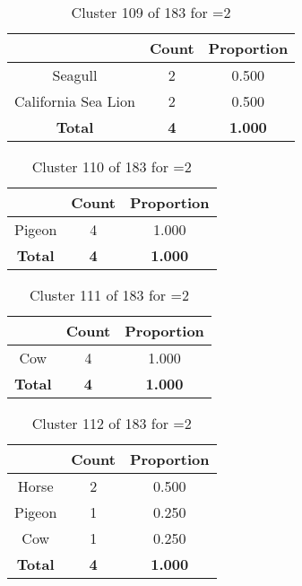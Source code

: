 \begin{table}[ht!]
\centering
\begin{tabular}{|c|c|c|}
\hline
\bf \Spec{} &\bf Count &\bf Proportion\\ \hline \hline
Seagull & 2 & 0.500\\ \hline
California Sea Lion & 2 & 0.500\\ \hline
\hline
\bf Total & \bf 4 & \bf 1.000\\ \hline
\end{tabular}
\label{tab:cluster:109:2}
\caption{Cluster 109 of 183 for \minneigh{}=2}
\end{table}

\clearpage
\begin{table}[ht!]
\centering
\begin{tabular}{|c|c|c|}
\hline
\bf \Spec{} &\bf Count &\bf Proportion\\ \hline \hline
Pigeon & 4 & 1.000\\ \hline
\hline
\bf Total & \bf 4 & \bf 1.000\\ \hline
\end{tabular}
\label{tab:cluster:110:2}
\caption{Cluster 110 of 183 for \minneigh{}=2}
\end{table}

\begin{table}[ht!]
\centering
\begin{tabular}{|c|c|c|}
\hline
\bf \Spec{} &\bf Count &\bf Proportion\\ \hline \hline
Cow & 4 & 1.000\\ \hline
\hline
\bf Total & \bf 4 & \bf 1.000\\ \hline
\end{tabular}
\label{tab:cluster:111:2}
\caption{Cluster 111 of 183 for \minneigh{}=2}
\end{table}

\begin{table}[ht!]
\centering
\begin{tabular}{|c|c|c|}
\hline
\bf \Spec{} &\bf Count &\bf Proportion\\ \hline \hline
Horse & 2 & 0.500\\ \hline
Pigeon & 1 & 0.250\\ \hline
Cow & 1 & 0.250\\ \hline
\hline
\bf Total & \bf 4 & \bf 1.000\\ \hline
\end{tabular}
\label{tab:cluster:112:2}
\caption{Cluster 112 of 183 for \minneigh{}=2}
\end{table}

